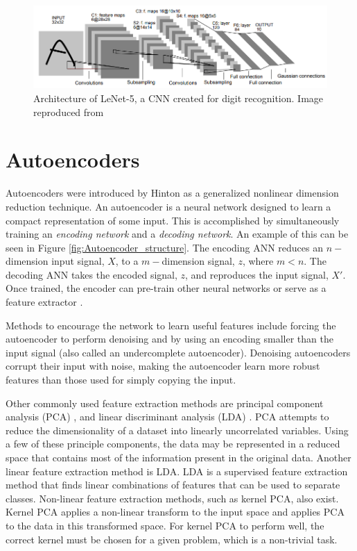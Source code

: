 \begin{figure}[H]
	\centering
	\includegraphics[width=0.85\linewidth]{images/cnn_mnist_lecun98}
	\caption{Architecture of LeNet-5, a CNN created for digit recognition. Image reproduced from \cite{Lecun1998}}
	\label{fig:cnn_mnist_lecun98}
\end{figure}

\section{Autoencoders} \label{Autoencoders}

Autoencoders were introduced by Hinton \cite{Hinton2006} as a generalized nonlinear dimension reduction technique. An autoencoder is a neural network designed to learn a compact representation of some input. This is accomplished by simultaneously training an \textit{encoding network} and a \textit{decoding network}. An example of this can be seen in Figure \ref{fig:Autoencoder_structure}. The encoding ANN reduces an $n-$dimension input signal, $X$, to a $m-$dimension signal, $z$, where $m < n$. The decoding ANN takes the encoded signal, $z$, and reproduces the input signal, $X'$. Once trained, the encoder can pre-train other neural networks or serve as a feature extractor \cite{Erhan2010,CHARTE2018}. 

Methods to encourage the network to learn useful features include forcing the autoencoder to perform denoising \cite{Vincent2008, Vincent2010} and by using an encoding smaller than the input signal (also called an undercomplete autoencoder). Denoising autoencoders corrupt their input with noise, making the autoencoder learn more robust features than those used for simply copying the input. 


Other commonly used feature extraction methods are principal component analysis (PCA) \cite{Jolliffe2002}, and linear discriminant analysis (LDA) \cite{Welling2007}. PCA attempts to reduce the dimensionality of a dataset into linearly uncorrelated variables. Using a few of these principle components, the data may be represented in a reduced space that contains most of the information present in the original data. Another linear feature extraction method is LDA. LDA is a supervised feature extraction method that finds linear combinations of features that can be used to separate classes. Non-linear feature extraction methods, such as kernel PCA, also exist. Kernel PCA applies a non-linear transform to the input space and applies PCA to the data in this transformed space. For kernel PCA to perform well, the correct kernel must be chosen for a given problem, which is a non-trivial task.

